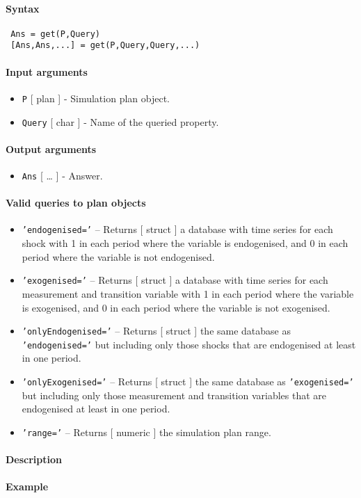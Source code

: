 


	\paragraph{Syntax}
 
 \begin{verbatim}
 Ans = get(P,Query)
 [Ans,Ans,...] = get(P,Query,Query,...)
 \end{verbatim}
 
 \paragraph{Input arguments}
 
 \begin{itemize}
 \item
   \texttt{P} {[} plan {]} - Simulation plan object.
 \item
   \texttt{Query} {[} char {]} - Name of the queried property.
 \end{itemize}
 
 \paragraph{Output arguments}
 
 \begin{itemize}
 \item
   \texttt{Ans} {[} \ldots{} {]} - Answer.
 \end{itemize}
 
 \paragraph{Valid queries to plan objects}
 
 \begin{itemize}
 \item
   \texttt{'endogenised='} -- Returns {[} struct {]} a database with time
   series for each shock with 1 in each period where the variable is
   endogenised, and 0 in each period where the variable is not
   endogenised.
 \item
   \texttt{'exogenised='} -- Returns {[} struct {]} a database with time
   series for each measurement and transition variable with 1 in each
   period where the variable is exogenised, and 0 in each period where
   the variable is not exogenised.
 \item
   \texttt{'onlyEndogenised='} -- Returns {[} struct {]} the same
   database as \texttt{'endogenised='} but including only those shocks
   that are endogenised at least in one period.
 \item
   \texttt{'onlyExogenised='} -- Returns {[} struct {]} the same database
   as \texttt{'exogenised='} but including only those measurement and
   transition variables that are endogenised at least in one period.
 \item
   \texttt{'range='} -- Returns {[} numeric {]} the simulation plan
   range.
 \end{itemize}
 
 \paragraph{Description}
 
 \paragraph{Example}


